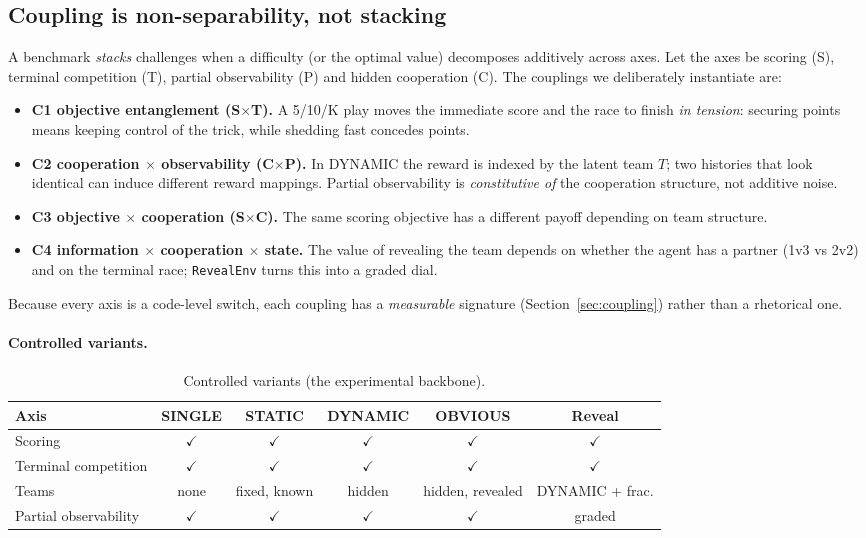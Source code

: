 \documentclass{article}
\begin{document}
\subsection{Coupling is non-separability, not stacking}
A benchmark \emph{stacks} challenges when a difficulty (or the optimal value)
decomposes additively across axes. Let the axes be scoring (S), terminal
competition (T), partial observability (P) and hidden cooperation (C). The
couplings we deliberately instantiate are:
\begin{itemize}
\item \textbf{C1 objective entanglement (S$\times$T).} A 5/10/K play moves the
immediate score and the race to finish \emph{in tension}: securing points means
keeping control of the trick, while shedding fast concedes points.
\item \textbf{C2 cooperation $\times$ observability (C$\times$P).} In DYNAMIC
the reward is indexed by the latent team $T$; two histories that look identical
can induce different reward mappings. Partial observability is
\emph{constitutive of} the cooperation structure, not additive noise.
\item \textbf{C3 objective $\times$ cooperation (S$\times$C).} The same scoring
objective has a different payoff depending on team structure.
\item \textbf{C4 information $\times$ cooperation $\times$ state.} The value of
revealing the team depends on whether the agent has a partner (1v3 vs 2v2) and
on the terminal race; \texttt{RevealEnv} turns this into a graded dial.
\end{itemize}
Because every axis is a code-level switch, each coupling has a \emph{measurable}
signature (Section~\ref{sec:coupling}) rather than a rhetorical one.

\paragraph{Controlled variants.}
\begin{table}[t]
\centering
\footnotesize
\caption{Controlled variants (the experimental backbone).}
\label{tab:variants}
\begin{tabular}{lccccc}
\toprule
Axis & SINGLE & STATIC & DYNAMIC & OBVIOUS & Reveal \\
\midrule
Scoring & $\checkmark$ & $\checkmark$ & $\checkmark$ & $\checkmark$ & $\checkmark$ \\
Terminal competition & $\checkmark$ & $\checkmark$ & $\checkmark$ & $\checkmark$ & $\checkmark$ \\
Teams & none & fixed, known & hidden & hidden, revealed & DYNAMIC + frac. \\
Partial observability & $\checkmark$ & $\checkmark$ & $\checkmark$ & $\checkmark$ & graded \\
\bottomrule
\end{tabular}
\end{table}
\end{document}
